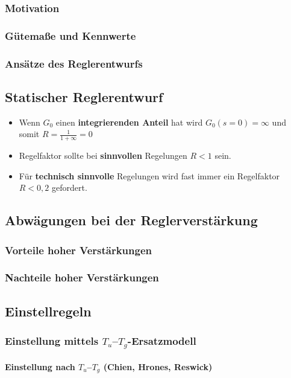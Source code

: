 \documentclass[12pt]{article}
\begin{document}
\subsubsection{Motivation}
\subsubsection{Gütemaße und Kennwerte}
\subsubsection{Ansätze des Reglerentwurfs}
\subsection{Statischer Reglerentwurf}
\begin{itemize}
	\item Wenn \(G_0\) einen \textbf{integrierenden Anteil} hat wird \(G_0(s=0) = \infty \) und somit \(R = \frac{1}{1+\infty }= 0\) 
	\item Regelfaktor sollte bei \textbf{sinnvollen} Regelungen \(R<1\) sein. 
	\item Für \textbf{technisch sinnvolle} Regelungen wird fast immer ein Regelfaktor \(R<0{,}2\) gefordert. 
\end{itemize}
\subsection{Abwägungen bei der Reglerverstärkung}
\subsubsection{Vorteile hoher Verstärkungen}
\subsubsection{Nachteile hoher Verstärkungen}
\subsection{Einstellregeln}
\subsubsection{Einstellung mittels \(T_u\)--\(T_g\)-Ersatzmodell}
\paragraph{Einstellung nach \(T_u\)--\(T_g\) (Chien, Hrones, Reswick)}
\end{document}
